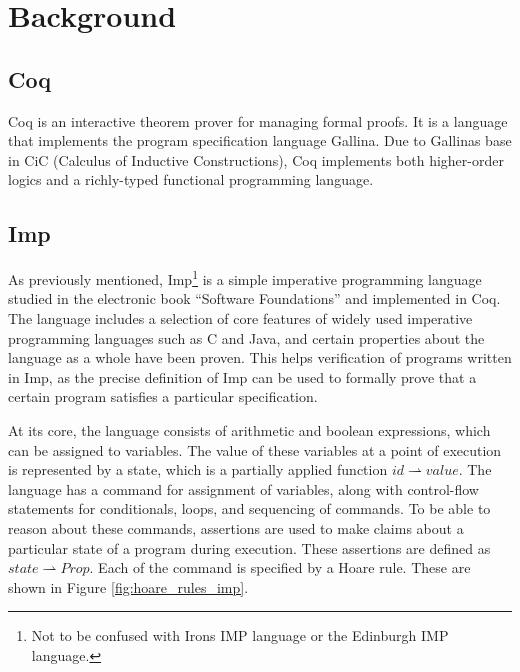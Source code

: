 \section{Background}
\label{sec:background}
\subsection{Coq}
Coq is an interactive theorem prover for managing formal proofs. It is a language that implements the program specification language Gallina. Due to Gallinas base in CiC (Calculus of Inductive Constructions), Coq implements both higher-order logics and a richly-typed functional programming language.

\subsection{Imp}
\label{sec:background_imp}
As previously mentioned, Imp\footnote{Not to be confused with Irons IMP language or the Edinburgh IMP language.} is a simple imperative programming language studied in the electronic book ``Software Foundations'' and implemented in Coq. The language includes a selection of core features of widely used imperative programming languages such as C and Java, and certain properties about the language as a whole have been proven. This helps verification of programs written in Imp, as the precise definition of Imp can be used to formally prove that a certain program satisfies a particular specification. 

At its core, the language consists of arithmetic and boolean expressions, which can be assigned to variables. The value of these variables at a point of execution is represented by a state, which is a partially applied function $id \rightharpoonup value$. The language has a command for assignment of variables, along with control-flow statements for conditionals, loops, and sequencing of commands. To be able to reason about these commands, assertions are used to make claims about a particular state of a program during execution. These assertions are defined as $state \rightharpoonup Prop$. Each of the command is specified by a Hoare rule. These are shown in Figure \ref{fig:hoare_rules_imp}.

